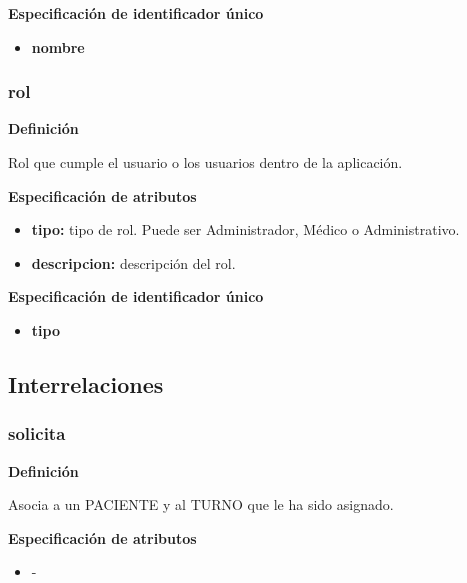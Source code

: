 \documentclass[a4paper,11pt]{article}
\begin{document}
\textbf{Especificación de identificador único}

\begin{itemize}

     \item \textbf{nombre}

\end{itemize}

\subsubsection{\textbf{rol}}

\textbf{Definición}

Rol que cumple el usuario o los usuarios dentro de la aplicación.

\textbf{Especificación de atributos}

\begin{itemize}

     \item \textbf{tipo:} tipo de rol. Puede ser Administrador, Médico o Administrativo. 
	 
     \item \textbf{descripcion:} descripción del rol. 

\end{itemize}

\textbf{Especificación de identificador único}

\begin{itemize}

     \item \textbf{tipo}

\end{itemize}



\subsection{\textbf{Interrelaciones}}

\subsubsection{\textbf{solicita}}

\textbf{Definición}

Asocia a un PACIENTE y al TURNO que le ha sido asignado.

\textbf{Especificación de atributos}

\begin{itemize}

	\item -

\end{itemize}
\end{document}
